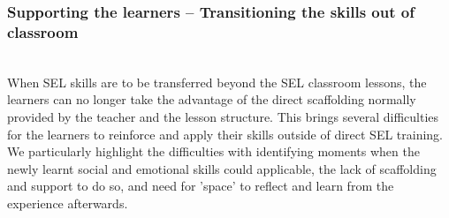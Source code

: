 \documentclass[prodmode,acmtochi]{acmsmall}
\newcommand{\todo}[1]{\textrm{\textrm{\textcolor{LightBlue}{[[#1]]}}}}
\begin{document}
\subsubsection{Supporting the learners  -- Transitioning the skills out of classroom}
\label{sec:Embedding-learners} ~ \\
When SEL skills are to be transferred beyond the SEL classroom lessons, the learners can no longer take the advantage of the direct scaffolding normally provided by the teacher and the lesson structure. This brings several difficulties for the learners to reinforce and apply their skills outside of direct SEL training. We particularly highlight the difficulties with identifying moments when the newly learnt social and emotional skills could applicable, the lack of scaffolding and support to do so, and need for 'space' to reflect and learn from the experience afterwards. 

\end{document}
